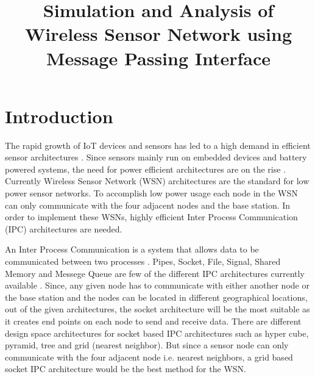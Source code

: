 \documentclass[conference]{IEEEtran}
\begin{document}
	
	\title{Simulation and Analysis of Wireless Sensor Network using Message Passing Interface }
	
	\author{
		}
	\maketitle
	
	\begin{abstract}
		
	\end{abstract}

	
	\begin{IEEEkeywords}
	
	\end{IEEEkeywords}
	
	\section{Introduction}
	
	The rapid growth of IoT devices and sensors has led to a high demand in efficient sensor architectures \cite{othman2012wireless}. Since sensors mainly run on embedded devices and battery powered systems, the need for power efficient architectures are on the rise \cite{guy2006wireless}. Currently Wireless Sensor Network (WSN) architectures are the standard for low power sensor networks. To accomplish low power usage each node in the WSN can only communicate with the four adjacent nodes and the base station. In order to implement these WSNs, highly efficient Inter Process Communication (IPC) architectures are needed.
	
	An Inter Process Communication is a system that allows data to be communicated between two processes \cite{techopedia.com}. Pipes, Socket, File, Signal, Shared Memory and Messege Queue are few of the different IPC architectures currently available \cite{onsman_2018}. Since, any given node has to communicate with either another node or the base station and the nodes can be located in different geographical locations, out of the given architectures, the socket architecture will be the most suitable as it creates end points on each node to send and receive data. There are different design space architectures for socket based IPC architectures such as hyper cube, pyramid, tree and grid (nearest neighbor). But since a sensor node can only communicate with the four adjacent node i.e. nearest neighbors, a grid based socket IPC architecture would be the best method for the WSN. 
	
\end{document}
